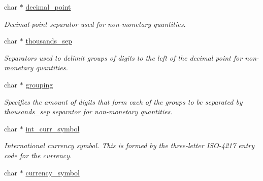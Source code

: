 \begin{DoxyCompactItemize}
\item 
\hypertarget{structlconv_a445e27fc7f797c8cca97b381f062fb60}{char $\ast$ \hyperlink{structlconv_a445e27fc7f797c8cca97b381f062fb60}{decimal\-\_\-point}}\label{structlconv_a445e27fc7f797c8cca97b381f062fb60}

\begin{DoxyCompactList}\small\item\em Decimal-\/point separator used for non-\/monetary quantities. \end{DoxyCompactList}\item 
\hypertarget{structlconv_aede8dfaac91d7b4e6b7fb0d96184d74d}{char $\ast$ \hyperlink{structlconv_aede8dfaac91d7b4e6b7fb0d96184d74d}{thousands\-\_\-sep}}\label{structlconv_aede8dfaac91d7b4e6b7fb0d96184d74d}

\begin{DoxyCompactList}\small\item\em Separators used to delimit groups of digits to the left of the decimal point for non-\/monetary quantities. \end{DoxyCompactList}\item 
\hypertarget{structlconv_a46e468755a823be50de20f36be5ff2be}{char $\ast$ \hyperlink{structlconv_a46e468755a823be50de20f36be5ff2be}{grouping}}\label{structlconv_a46e468755a823be50de20f36be5ff2be}

\begin{DoxyCompactList}\small\item\em Specifies the amount of digits that form each of the groups to be separated by thousands\-\_\-sep separator for non-\/monetary quantities. \end{DoxyCompactList}\item 
\hypertarget{structlconv_abaeeafb02b68ba58c549458b196b9325}{char $\ast$ \hyperlink{structlconv_abaeeafb02b68ba58c549458b196b9325}{int\-\_\-curr\-\_\-symbol}}\label{structlconv_abaeeafb02b68ba58c549458b196b9325}

\begin{DoxyCompactList}\small\item\em International currency symbol. This is formed by the three-\/letter I\-S\-O-\/4217 entry code for the currency. \end{DoxyCompactList}\item 
\hypertarget{structlconv_af3657bb8bf2a83a868cdeb0b108ab921}{char $\ast$ \hyperlink{structlconv_af3657bb8bf2a83a868cdeb0b108ab921}{currency\-\_\-symbol}}\label{structlconv_af3657bb8bf2a83a868cdeb0b108ab921}


\end{DoxyCompactItemize}
